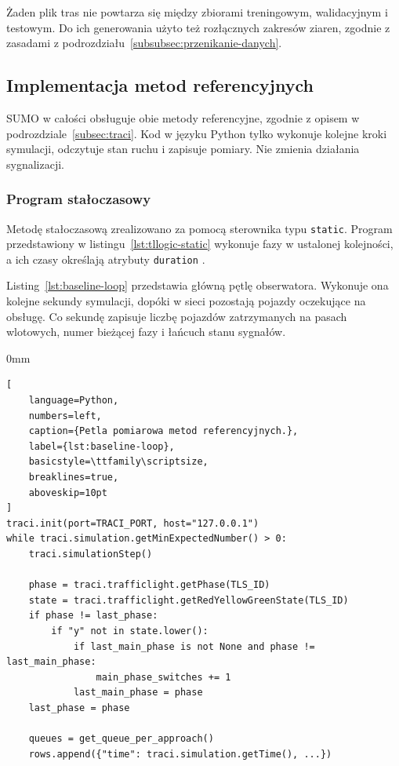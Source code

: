 Żaden plik tras nie powtarza się między zbiorami treningowym, walidacyjnym i testowym. Do ich generowania użyto też rozłącznych zakresów ziaren, zgodnie z zasadami z podrozdziału~\ref{subsubsec:przenikanie-danych}.

\subsection{Implementacja metod referencyjnych}
\label{subsec:implementacja-referencyjnych}

SUMO w całości obsługuje obie metody referencyjne, zgodnie z opisem w podrozdziale~\ref{subsec:traci}. Kod w języku Python tylko wykonuje kolejne kroki symulacji, odczytuje stan ruchu i zapisuje pomiary. Nie zmienia działania sygnalizacji.

\subsubsection{Program stałoczasowy}
\label{subsubsec:impl-staloczasowy}

Metodę stałoczasową zrealizowano za pomocą sterownika typu \texttt{static}. Program przedstawiony w listingu~\ref{lst:tllogic-static} wykonuje fazy w ustalonej kolejności, a ich czasy określają atrybuty \texttt{duration} \cite{sumoTrafficLights}.

Listing~\ref{lst:baseline-loop} przedstawia główną pętlę obserwatora. Wykonuje ona kolejne sekundy symulacji, dopóki w sieci pozostają pojazdy oczekujące na obsługę. Co sekundę zapisuje liczbę pojazdów zatrzymanych na pasach wlotowych, numer bieżącej fazy i łańcuch stanu sygnałów.

\begin{addmargin}[8mm]{0mm}
\begin{lstlisting}[
    language=Python,
    numbers=left,
    caption={Petla pomiarowa metod referencyjnych.},
    label={lst:baseline-loop},
    basicstyle=\ttfamily\scriptsize,
    breaklines=true,
    aboveskip=10pt
]
traci.init(port=TRACI_PORT, host="127.0.0.1")
while traci.simulation.getMinExpectedNumber() > 0:
    traci.simulationStep()

    phase = traci.trafficlight.getPhase(TLS_ID)
    state = traci.trafficlight.getRedYellowGreenState(TLS_ID)
    if phase != last_phase:
        if "y" not in state.lower():
            if last_main_phase is not None and phase != last_main_phase:
                main_phase_switches += 1
            last_main_phase = phase
    last_phase = phase

    queues = get_queue_per_approach()
    rows.append({"time": traci.simulation.getTime(), ...})
\end{lstlisting}
\end{addmargin}


